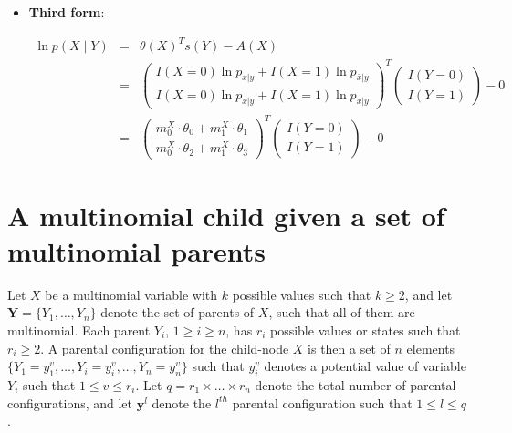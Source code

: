 \documentclass[11pt, oneside]{article}   	%
\numberwithin{figure}{section}
\numberwithin{equation}{section}
\numberwithin{table}{section}
\begin{document}
\begin{itemize}
\item \textbf{Third form}:

\begin{eqnarray*}
\ln p(X \mid Y) &=& \theta(X)^T s(Y) - A(X) \\
&=&
\begin{pmatrix}
I(X=0)\ln p_{x|y}  + I(X=1)\ln p_{\bar{x}|y}\\
I(X=0)\ln p_{x|\bar{y}}  + I(X=1)\ln p_{\bar{x}|\bar{y}}
\end{pmatrix}^T
\begin{pmatrix}
I(Y=0) \\
I(Y=1)
\end{pmatrix}
- 0\\
&=&
\begin{pmatrix}
m^X_0 \cdot \theta_0  +  m^X_1\cdot \theta_1\\
m^X_0 \cdot \theta_2  + m^X_1 \cdot \theta_3
\end{pmatrix}^T
\begin{pmatrix}
I(Y=0) \\
I(Y=1)
\end{pmatrix}
- 0
\end{eqnarray*}

\end{itemize}

\newpage
\section{A multinomial child given a set of multinomial parents}

Let $X$ be a multinomial variable with $k$ possible values such that $k \geq 2$, and let $\mathbf{Y} =\{Y_1,\ldots,Y_n\}$ denote the set of parents of $X$, such that all of them are multinomial. Each parent $Y_i$, $1 \geq i \geq n$, has $r_i$ possible values or states such that $r_i \geq 2$. A parental configuration for the child-node $X$ is then a set of $n$ elements $\{Y_1 = y_1^{v}, \ldots, Y_i = y_i^{v},\ldots, Y_n = y_n^{v} \}$ such that $y_i^{v}$ denotes a potential value of variable $Y_i$ such that  $1 \leq v \leq r_i$. Let $q = r_1 \times \ldots \times r_n$ denote the total number of parental configurations, and let $\mathbf{y}^l$ denote the $l^{th}$ parental configuration such that $1 \leq l \leq q$.
\end{document}
